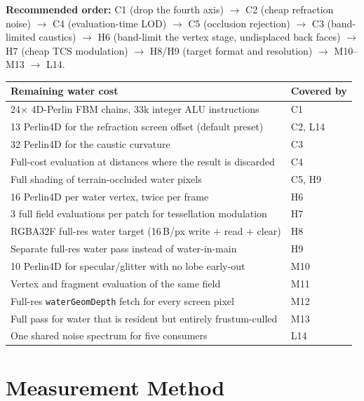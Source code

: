 \documentclass[11pt,a4paper]{article}
\begin{document}
\textbf{Recommended order:} C1 (drop the fourth axis) $\rightarrow$ C2 (cheap refraction noise) $\rightarrow$ C4
(evaluation-time LOD) $\rightarrow$ C5 (occlusion rejection) $\rightarrow$ C3 (band-limited caustics) $\rightarrow$ H6
(band-limit the vertex stage, undisplaced back faces) $\rightarrow$ H7 (cheap TCS modulation) $\rightarrow$ H8/H9
(target format and resolution) $\rightarrow$ M10--M13 $\rightarrow$ L14.

\begin{table}[h]
\centering
\small
\begin{tabular}{@{}ll@{}}
\toprule
\textbf{Remaining water cost} & \textbf{Covered by} \\
\midrule
24$\times$ 4D-Perlin FBM chains, 33k integer ALU instructions & C1 \\
13 Perlin4D for the refraction screen offset (default preset) & C2, L14 \\
32 Perlin4D for the caustic curvature & C3 \\
Full-cost evaluation at distances where the result is discarded & C4 \\
Full shading of terrain-occluded water pixels & C5, H9 \\
16 Perlin4D per water vertex, twice per frame & H6 \\
3 full field evaluations per patch for tessellation modulation & H7 \\
RGBA32F full-res water target (16\,B/px write $+$ read $+$ clear) & H8 \\
Separate full-res water pass instead of water-in-main & H9 \\
10 Perlin4D for specular/glitter with no lobe early-out & M10 \\
Vertex and fragment evaluation of the same field & M11 \\
Full-res \texttt{waterGeomDepth} fetch for every screen pixel & M12 \\
Full pass for water that is resident but entirely frustum-culled & M13 \\
One shared noise spectrum for five consumers & L14 \\
\bottomrule
\end{tabular}
\end{table}

\section{Measurement Method}
\label{sec:method}
\end{document}

